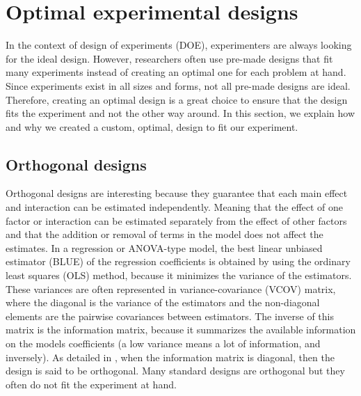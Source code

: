 
\section{Optimal experimental designs}
In the context of design of experiments (DOE), experimenters are always looking for the ideal design. However, researchers often use pre-made designs that fit many experiments instead of creating an optimal one for each problem at hand. Since experiments exist in all sizes and forms, not all pre-made designs are ideal. Therefore, creating an optimal design is a great choice to ensure that the design fits the experiment and not the other way around. In this section, we explain how and why we created a custom, optimal, design to fit our experiment.

\subsection{Orthogonal designs}
Orthogonal designs are interesting because they guarantee that each main effect and interaction can 
be estimated independently. Meaning that the effect of one factor or interaction can be estimated separately from the effect of 
other factors
and that the addition or removal of terms in the model does not affect the estimates.
In a regression or ANOVA-type model, the best linear unbiased estimator (BLUE) of the regression coefficients is obtained by 
using 
the ordinary least squares (OLS) method, because it minimizes the variance of the estimators. 
These variances are often represented in variance-covariance (VCOV) matrix, 
where the diagonal is the variance of the estimators and the non-diagonal elements are the pairwise covariances between 
estimators. 
The inverse of this matrix is the information matrix, 
because it summarizes the available information  on the models coefficients (a low variance means a lot of information, and 
inversely).
As detailed in \textcite{goos_optimal_2011}, when the information matrix is diagonal, then the design is said to be orthogonal. Many standard designs are orthogonal but they often do not fit the experiment at hand.

